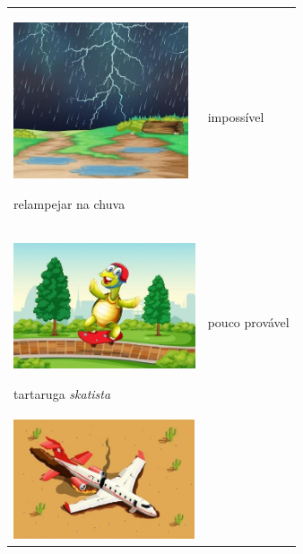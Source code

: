 \begin{longtable}[]{@{}ll@{}}
\toprule
\begin{minipage}[t]{0.48\columnwidth}\raggedright\strut
\includegraphics[width=2.03487in,height=1.82023in]{media/image82.jpg}

relampejar na chuva\strut
\end{minipage} & \begin{minipage}[t]{0.48\columnwidth}\raggedright\strut
impossível\strut
\end{minipage}\tabularnewline
\begin{minipage}[t]{0.48\columnwidth}\raggedright\strut
\includegraphics[width=2.11035in,height=1.45968in]{media/image83.jpg}

tartaruga \textit{skatista}\strut
\end{minipage} & \begin{minipage}[t]{0.48\columnwidth}\raggedright\strut
pouco provável\strut
\end{minipage}\tabularnewline
\begin{minipage}[t]{0.48\columnwidth}\raggedright\strut
\includegraphics[width=2.11129in,height=1.37616in]{media/image84.jpg}


\end{minipage}
\end{longtable}
